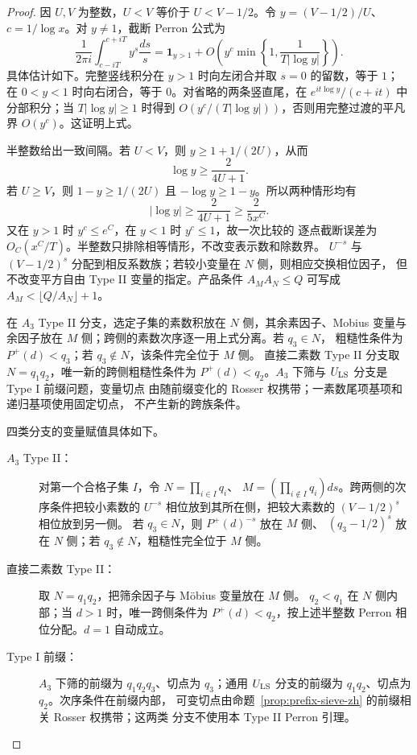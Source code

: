 \documentclass[UTF8,10pt,a4paper]{ctexart}
\newcommand{\1}{\mathbf{1}}
\theoremstyle{remark}
\begin{document}
\begin{proof}
因 $U,V$ 为整数，$U<V$ 等价于 $U<V-1/2$。令
$y=(V-1/2)/U$、$c=1/\log x$。对 $y\ne1$，截断 Perron 公式为
\[
 \frac{1}{2\pi i}\int_{c-iT}^{c+iT}y^s\frac{ds}{s}
 =\1_{y>1}+O\!\left(y^c
 \min\left\{1,\frac1{T|\log y|}\right\}\right).
\]
具体估计如下。完整竖线积分在 $y>1$ 时向左闭合并取 $s=0$ 的留数，等于 $1$；
在 $0<y<1$ 时向右闭合，等于 $0$。对省略的两条竖直尾，在
$e^{it\log y}/(c+it)$ 中分部积分；当 $T|\log y|\ge1$ 时得到
$O(y^c/(T|\log y|))$，否则用完整过渡的平凡界 $O(y^c)$。这证明上式。

半整数给出一致间隔。若 $U<V$，则 $y\ge1+1/(2U)$，从而
\[
 \log y\ge\frac2{4U+1}.
\]
若 $U\ge V$，则 $1-y\ge1/(2U)$ 且
$-\log y\ge1-y$。所以两种情形均有
\[
 |\log y|\ge\frac2{4U+1}\ge\frac2{5x^C}.
\]
又在 $y>1$ 时 $y^c\le e^C$，在 $y<1$ 时 $y^c\le1$，故一次比较的
逐点截断误差为 $O_C(x^C/T)$。半整数只排除相等情形，不改变表示数和除数界。
$U^{-s}$ 与
$(V-1/2)^s$ 分配到相反系数族；若较小变量在 $N$ 侧，则相应交换相位因子，
但不改变平方自由 Type II 变量的指定。产品条件 $A_MA_N\le Q$ 可写成
$A_M<\lfloor Q/A_N\rfloor+1$。

在 $A_3$ Type II 分支，选定子集的素数积放在 $N$ 侧，其余素因子、Mobius
变量与余因子放在 $M$ 侧；跨侧的素数次序逐一用上式分离。若 $q_3\in N$，
粗糙性条件为 $P^+(d)<q_3$；若 $q_3\notin N$，该条件完全位于 $M$ 侧。
直接二素数 Type II 分支取 $N=q_1q_2$，唯一新的跨侧粗糙性条件为
$P^+(d)<q_2$。$A_3$ 下筛与 $U_{\rm LS}$ 分支是 Type I 前缀问题，变量切点
由随前缀变化的 Rosser 权携带；一素数尾项基项和递归基项使用固定切点，
不产生新的跨族条件。

四类分支的变量赋值具体如下。
\begin{description}
\item[$A_3$ Type II：]
对第一个合格子集 $I$，令
$N=\prod_{i\in I}q_i$、
$M=(\prod_{i\notin I}q_i)ds$。跨两侧的次序条件把较小素数的
$U^{-s}$ 相位放到其所在侧，把较大素数的 $(V-1/2)^s$ 相位放到另一侧。
若 $q_3\in N$，则 $P^+(d)^{-s}$ 放在 $M$ 侧、
$(q_3-1/2)^s$ 放在 $N$ 侧；若 $q_3\notin N$，粗糙性完全位于 $M$ 侧。

\item[直接二素数 Type II：]
取 $N=q_1q_2$，把筛余因子与 Möbius 变量放在 $M$ 侧。
$q_2<q_1$ 在 $N$ 侧内部；当 $d>1$ 时，唯一跨侧条件为
$P^+(d)<q_2$，按上述半整数 Perron 相位分配。$d=1$ 自动成立。

\item[Type I 前缀：]
$A_3$ 下筛的前缀为 $q_1q_2q_3$、切点为 $q_3$；通用
$U_{\rm LS}$ 分支的前缀为 $q_1q_2$、切点为 $q_2$。次序条件在前缀内部，
可变切点由命题~\ref{prop:prefix-sieve-zh} 的前缀相关 Rosser 权携带；这两类
分支不使用本 Type II Perron 引理。


\end{description}
\end{proof}
\end{document}
